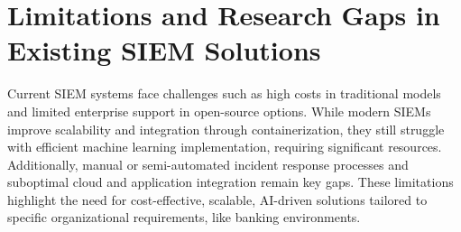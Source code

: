 \section{Limitations and Research Gaps in Existing SIEM Solutions}
\label{sec_limitations_and_research_gaps}

Current SIEM systems face challenges such as high costs in traditional models and limited enterprise support in open-source options. While modern SIEMs improve scalability and integration through containerization, they still struggle with efficient machine learning implementation, requiring significant resources. Additionally, manual or semi-automated incident response processes and suboptimal cloud and application integration remain key gaps. These limitations highlight the need for cost-effective, scalable, AI-driven solutions tailored to specific organizational requirements, like banking environments.
